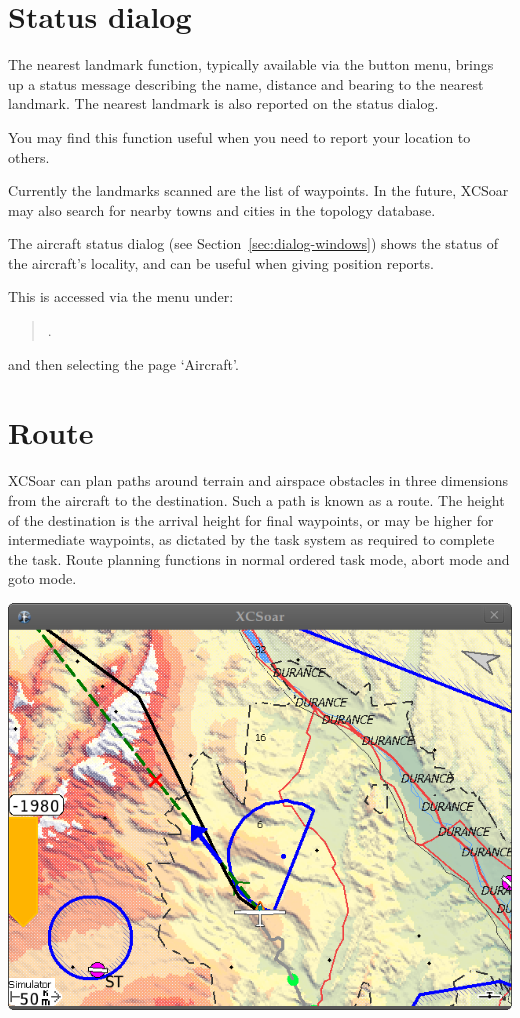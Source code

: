 \section{Status dialog}\label{sec:aircr-stat-dial}

The nearest landmark function, typically available via the button
menu, brings up a status message describing the name, distance and
bearing to the nearest landmark.  The nearest landmark is also
reported on the status dialog.

You may find this function useful when you need to report your
location to others.

Currently the landmarks scanned are the list of waypoints.  In the
future, XCSoar may also search for nearby towns and cities in the
topology database.

The aircraft status dialog (see Section~\ref{sec:dialog-windows})
shows the status of the aircraft's locality, and can be useful when
giving position reports.

This is accessed via the menu under: 
\begin{quote}
\blink{}\blink{}.
\end{quote}
and then selecting the page `Aircraft'.

\section{Route}\label{sec:route}

XCSoar can plan paths around terrain and airspace obstacles in three
dimensions from the aircraft to the destination.  Such a path is known
as a route.  The height of the destination is the arrival height for
final waypoints, or may be higher for intermediate waypoints, as
dictated by the task system as required to complete the task.  Route
planning functions in normal ordered task mode, abort mode and goto
mode.

\begin{center}
\includegraphics[angle=0,width=1.0\linewidth,keepaspectratio='true']{figures/route3.png}
\end{center}

